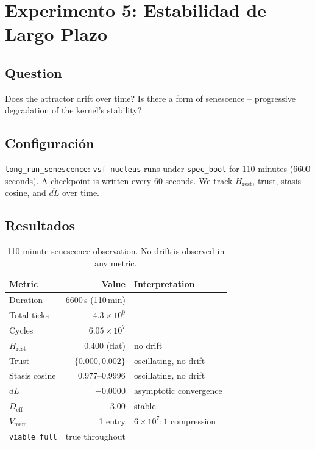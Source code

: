 \documentclass[11pt, a4paper]{article}
\newcommand{\nucleus}{\texttt{vsf-nucleus}}
\begin{document}
\section{Experimento 5: Estabilidad de Largo Plazo}
\label{sec:senescence}

\subsection*{Question} Does the attractor drift over time?
Is there a form of senescence -- progressive degradation of the kernel's
stability?

\subsection{Configuración}

\texttt{long\_run\_senescence}: \nucleus{} runs under \texttt{spec\_boot}
for 110 minutes (6600 seconds).
A checkpoint is written every 60 seconds.
We track $H_\text{rest}$, trust, stasis cosine, and $\overline{dL}$ over
time.

\subsection{Resultados}

\begin{table}[h]
\centering
\begin{tabular}{lrl}
\toprule
Metric & Value & Interpretation \\
\midrule
Duration & 6600\,s (110\,min) & \\
Total ticks & $4.3 \times 10^9$ & \\
Cycles & $6.05 \times 10^7$ & \\
$H_\text{rest}$ & 0.400 (flat) & no drift \\
Trust & $\{0.000, 0.002\}$ & oscillating, no drift \\
Stasis cosine & $0.977$--$0.9996$ & oscillating, no drift \\
$\overline{dL}$ & $-0.000\overline{0}$ & asymptotic convergence \\
$D_\text{eff}$ & 3.00 & stable \\
$V_\text{mem}$ & 1 entry & $6 \times 10^7 : 1$ compression \\
\texttt{viable\_full} & true throughout & \\
\bottomrule
\end{tabular}
\caption{110-minute senescence observation.
No drift is observed in any metric.}
\label{tab:senescence}
\end{table}
\end{document}
